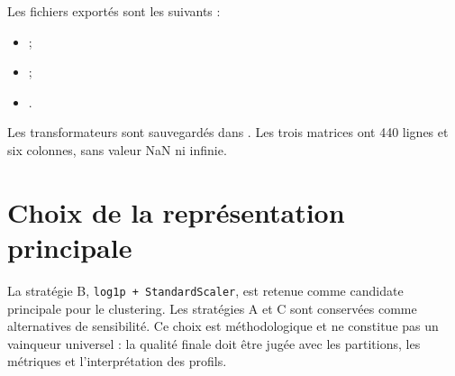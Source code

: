 Les fichiers exportés sont les suivants :
\begin{itemize}
  \item {} ;
  \item {} ;
  \item {}.
\end{itemize}
Les transformateurs sont sauvegardés dans . Les trois matrices ont 440 lignes et six colonnes, sans valeur NaN ni infinie.

\section{Choix de la représentation principale}
La stratégie B, \texttt{log1p + StandardScaler}, est retenue comme candidate principale pour le clustering. Les stratégies A et C sont conservées comme alternatives de sensibilité. Ce choix est méthodologique et ne constitue pas un vainqueur universel : la qualité finale doit être jugée avec les partitions, les métriques et l'interprétation des profils.

